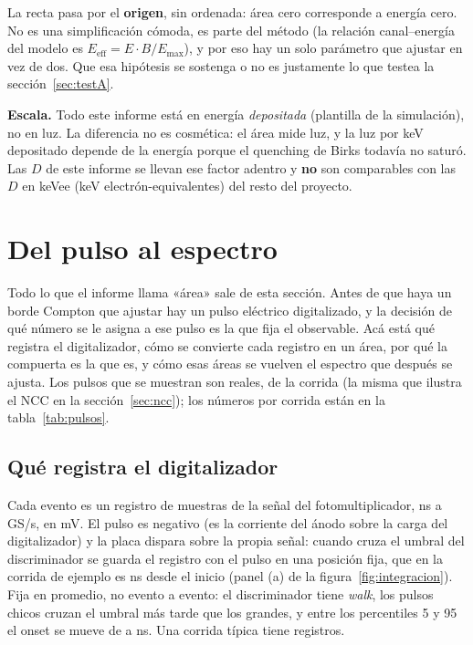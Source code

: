 \documentclass[11pt,a4paper]{article}
\begin{document}
La recta pasa por el \textbf{origen}, sin ordenada: área cero corresponde a
energía cero. No es una simplificación cómoda, es parte del método (la relación
canal--energía del modelo es $E_{\text{eff}} = E\cdot B/E_{\max}$), y por eso
hay un solo parámetro que ajustar en vez de dos. Que esa hipótesis se sostenga
o no es justamente lo que testea la sección~\ref{sec:testA}.

\begin{aviso}
\textbf{Escala.} Todo este informe está en energía \emph{depositada}
(plantilla \texttt{\Rama} de la simulación), no en luz. La diferencia no es
cosmética: el área mide luz, y la luz por keV depositado depende de la energía
porque el quenching de Birks todavía no saturó. Las $D$ de este informe se
llevan ese factor adentro y \textbf{no} son comparables con las $D$ en keVee
(keV electrón-equivalentes) del resto del proyecto.
\end{aviso}

\section{Del pulso al espectro}
\label{sec:pulsos}

Todo lo que el informe llama «área» sale de esta sección. Antes de que haya
un borde Compton que ajustar hay un pulso eléctrico digitalizado, y la
decisión de qué número se le asigna a ese pulso es la que fija el observable.
Acá está qué registra el digitalizador, cómo se convierte cada registro en un
área, por qué la compuerta es la que es, y cómo esas áreas se vuelven el
espectro que después se ajusta. Los pulsos que se muestran son reales, de la
corrida \EjCorrida{} (la misma que ilustra el NCC en la
sección~\ref{sec:ncc}); los números por corrida están en la
tabla~\ref{tab:pulsos}.

\subsection{Qué registra el digitalizador}

Cada evento es un registro de \Muestras{} muestras de la señal del
fotomultiplicador, \Registro{} ns a \Muestreo{} GS/s, en mV. El pulso es
negativo (es la corriente del ánodo sobre la carga del digitalizador) y la
placa dispara sobre la propia señal: cuando cruza el umbral del discriminador
se guarda el registro con el pulso en una posición fija, que en la corrida de
ejemplo es \EjOnsetMediano{} ns desde el inicio (panel (a) de la
figura~\ref{fig:integracion}). Fija en promedio, no evento a evento: el
discriminador tiene \emph{walk}, los pulsos chicos cruzan el umbral más tarde
que los grandes, y entre los percentiles 5 y 95 el onset se mueve de
\EjOnsetCinco{} a \EjOnsetNoventaycinco{} ns. Una corrida típica tiene
\EventosTipico{} registros.
\end{document}
